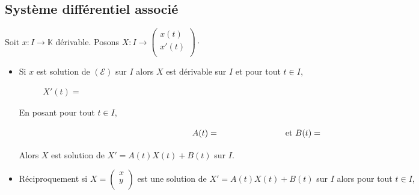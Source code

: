 \documentclass[a4paper,10pt]{report}
\begin{document}
\subsection{Système différentiel associé}
\noindent Soit $x : I \rightarrow \mathbb{K}$ dérivable. Posons $X : I \rightarrow \begin{pmatrix}
x(t) \\
x'(t) \\
\end{pmatrix} \cdot$

\begin{itemize}
\item Si $x$ est solution de $(\mathcal{E})$ sur $I$ alors $X$ est dérivable sur $I$ et pour tout $t \in I$,
$$ X'(t) = \phantom{\begin{pmatrix}
x'(t) \\
x''(t) \\
\end{pmatrix} = \begin{pmatrix}
x'(t) \\
-a(t)x'(t)-b(t)x(t)+c(t) \\
\end{pmatrix} = \begin{pmatrix}
0 & 1 \\
-b(t) & - a(t) \\
\end{pmatrix} \begin{pmatrix}
x(t) \\
x'(t) \\
\end{pmatrix} + \begin{pmatrix}
0 \\
c(t)
\end{pmatrix}}$$
En posant pour tout $t \in I$,
$$ A(t) = \phantom{\begin{pmatrix}
0 & 1 \\
-b(t) & -a(t) \\
\end{pmatrix}} \; \hbox{ et } B(t) = \phantom{\begin{pmatrix}
0 \\
c(t)
\end{pmatrix}}$$
Alors $X$ est solution de $X'=A(t)X(t)+B(t)$ sur $I$.
\item Réciproquement si $X = \begin{pmatrix}
x \\
y \\
\end{pmatrix}$ est une solution de $X'=A(t)X(t)+B(t)$ sur $I$ alors pour tout $t \in I$,

\end{itemize}
\end{document}
